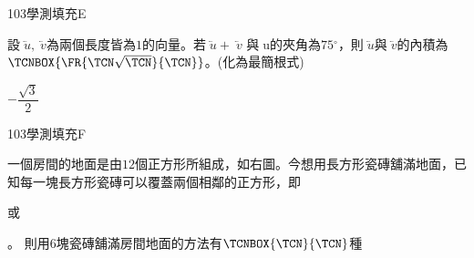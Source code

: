 \begin{QUESTIONS}
\begin{QUESTION}
        \begin{ExamInfo}{103}{學測}{填充}{E}
        \end{ExamInfo}
        \begin{ExamAnsRateInfo}{31}{75}{17}{1}
        \end{ExamAnsRateInfo}
        \begin{QBODY}
            設$\lvec{u},\lvec{v}$為兩個長度皆為$1$的向量。若$\lvec{u} +\lvec{v}$ 與u的夾角為$75{}^\circ $，則$\lvec{u}$與$\lvec{v} $的內積為$\TCNBOX{\FR{\TCN\sqrt{\TCN}}{\TCN}}$。(化為最簡根式)
        \end{QBODY}
        \begin{QFROMS}
        \end{QFROMS}
        \begin{QTAGS}\end{QTAGS}
        \begin{QANS}
            $-\dfrac{\sqrt{3}}{2}$
        \end{QANS}
        \begin{QSOLLIST}
        \end{QSOLLIST}
        \begin{QEMPTYSPACE}
        \end{QEMPTYSPACE}
    \end{QUESTION}
    \begin{QUESTION}
        \begin{ExamInfo}{103}{學測}{填充}{F}
        \end{ExamInfo}
        \begin{ExamAnsRateInfo}{22}{44}{17}{5}
        \end{ExamAnsRateInfo}
        \begin{QBODY}
            一個房間的地面是由$12$個正方形所組成，如右圖。今想用長方形瓷磚舖滿地面，已知每一塊長方形瓷磚可以覆蓋兩個相鄰的正方形，即
			或 
			。
			則用$6$塊瓷磚舖滿房間地面的方法有$\TCNBOX{\TCN}{\TCN}$種


\end{QBODY}
\end{QUESTION}
\end{QUESTIONS}
